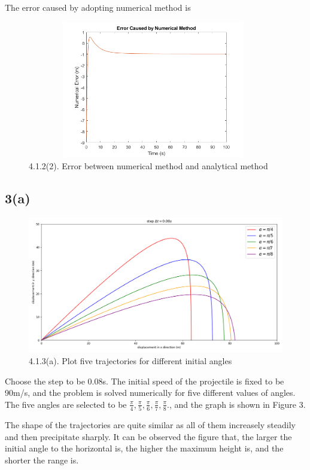 \documentclass{article}
\begin{document}
The error caused by adopting numerical method is
\begin{figure}[H]
  \centering
  \includegraphics[width=11cm,height=6cm]{./graphs/4_1_2_analytical_offset.png}
  \caption{4.1.2(2). Error between numerical method and analytical method}
\end{figure}

\subsection*{3(a)}
\begin{figure}[H]
  \centering
  \includegraphics[scale=0.4]{./graphs/project4.1.3(a).png}
  \caption{4.1.3(a). Plot five trajectories for different initial angles}
\end{figure}
Choose the step to be 0.08s.
The initial speed of the projectile is fixed to be 90m/s, and the problem is solved numerically for five different values of angles.
  {The five angles are selected to be $\frac{\pi}{4},\frac{\pi}{5},\frac{\pi}{6},\frac{\pi}{7},\frac{\pi}{8}.$}, and the graph is shown in Figure 3.

The shape of the trajectories are quite similar as all of them increasely steadily and then precipitate sharply.
It can be observed the figure that, the larger the initial angle to the horizontal is, the higher the maximum height is, and the shorter the range is.
\end{document}
